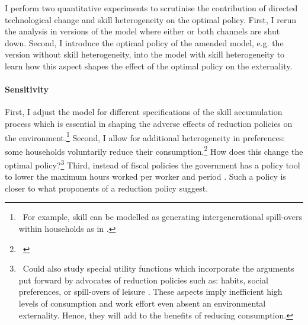 
I perform two quantitative experiments to scrutinise the contribution of directed technological change and skill heterogeneity on the optimal policy. First, I rerun the analysis in versions of the model where either or both channels are shut down.  Second, I introduce the optimal policy of the amended model, e.g. the  version without skill heterogeneity, into the model with skill heterogeneity to learn how this aspect shapes the effect of the optimal policy on the externality. %

\paragraph{Sensitivity}
First, I adjust the model for different specifications of the skill accumulation process which is essential in shaping the adverse effects of reduction policies on the environment.\footnote{\ For example, skill can be modelled as generating intergenerational spill-overs within households as in \cite{Borissov2019CarbonDevelopment}.} Second, I allow for additional heterogeneity in preferences: some households voluntarily reduce their consumption.\footnote{\ } How does this change the optimal policy?\footnote{\ Could also study special utility functions which incorporate the arguments put forward by advocates of reduction policies such as: habits, social preferences, or  spill-overs of leisure \citep[][\textit{to be read}]{Alesina2005WorkDifferent}. These aspects imply inefficient high levels of consumption and work effort even absent an environmental externality.  Hence, they will add to the benefits of reducing consumption. 
}
Third, instead of fiscal policies the government has a policy tool to lower the maximum hours worked per worker and period \citep[\textit{compare}][]{Alvarez-Cuadrado2007EnvyHours}. Such a policy is closer to what proponents of a reduction policy suggest. %
\\

